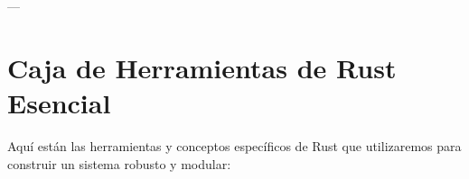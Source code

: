\documentclass{article}
\begin{document}
	---
	
	\section{Caja de Herramientas de Rust Esencial}
	Aquí están las herramientas y conceptos específicos de Rust que utilizaremos para construir un sistema robusto y modular:
	
	\begin{itemize}[label=$\bullet$]

\end{itemize}
\end{document}
